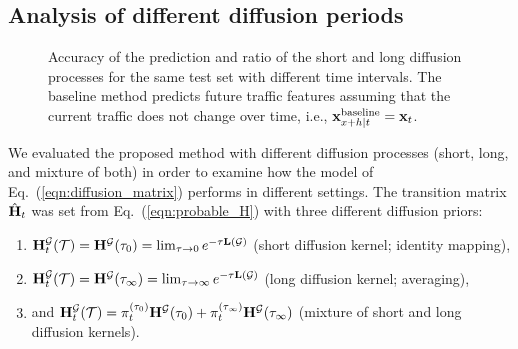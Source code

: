 \documentclass[journal]{IEEEtran}
\begin{document}
\subsection{Analysis of different diffusion periods}\label{sec:different_diffusion_periods}
\begin{figure*}[!ht]    
   \centering
   \hfill
   \hfill
   \hfill
   \hfill
   \caption{Accuracy of the prediction and ratio of the short and long diffusion processes for the same test set with different time intervals.
   The baseline method predicts future traffic features assuming that the current traffic does not change over time, i.e., ${\bf{x}}_{x+h|t}^{\text{baseline}}={\bf{x}}_t$.
   }\label{fig:rmse_performance_long_short}
\end{figure*}
We evaluated the proposed method with different diffusion processes (short, long, and mixture of both) in order to examine how the model of Eq.~(\ref{eqn:diffusion_matrix}) performs in different settings. The transition matrix $\hat{\bf{H}}_t$ was set from Eq.~(\ref{eqn:probable_H}) with three different diffusion priors:
\begin{enumerate}
  \item ${\bf{H}}_t^\mathcal{G}(\mathcal{T})={\bf{H}}^\mathcal{G}(\tau_0)=\lim_{\tau\rightarrow 0}e^{-\tau {\bf{L}}(\mathcal{G})}$ (short diffusion kernel; identity mapping),
  \item ${\bf{H}}_t^\mathcal{G}(\mathcal{T})={\bf{H}}^\mathcal{G}(\tau_\infty)=\lim_{\tau\rightarrow \infty}e^{-\tau {\bf{L}}(\mathcal{G})}$ (long diffusion kernel; averaging),
  \item and ${\bf{H}}_t^\mathcal{G}(\mathcal{T})=\pi_t^{(\tau_0)}{\bf{H}}^\mathcal{G}(\tau_0)+\pi_t^{(\tau_\infty)}{\bf{H}}^\mathcal{G}(\tau_\infty)$ (mixture of short and long diffusion kernels).
\end{enumerate}
\end{document}
